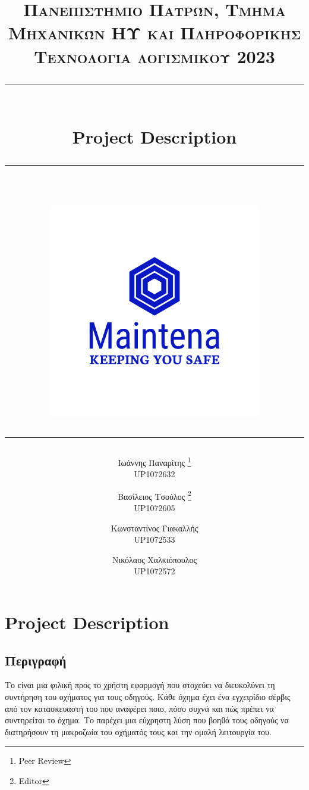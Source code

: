 \documentclass[11pt]{scrartcl} %
\title{	
	\normalfont\normalsize
	\textsc{Πανεπιστήμιο Πατρών, Τμήμα Μηχανικών ΗΥ και Πληροφορικής \\Τεχνολογία λογισμικού 2023}\\ %
	\vspace{25pt} %
	\rule{\linewidth}{0.5pt}\\ %
	\vspace{20pt} %
    {\Large Project Description}\\ %
	\vspace{12pt} %
	\rule{\linewidth}{0.5pt}\\ %
	\vspace{12pt} %
    \includegraphics[width=0.7\textwidth]{../../brand/png/logo-transparent.png}
        \rule{\linewidth}{2pt}
}
\author{
Ιωάννης Παναρίτης \thanks{Peer Review} \\UP1072632 \and Βασίλειος Τσούλος \thanks{Editor} \\UP1072605 \and Κωνσταντίνος Γιακαλλής \\UP1072533 \and \hspace{-0.9cm} Νικόλαος Χαλκιόπουλος \\ \hspace{-0.9cm}UP1072572
}
\date{} %
\begin{document}
\maketitle
\pagebreak
\Large

\tableofcontents

\section{Project Description}

\subsection{Περιγραφή}

Το  είναι μια φιλική προς το χρήστη εφαρμογή που στοχεύει να διευκολύνει τη συντήρηση του οχήματος για τους οδηγούς. Κάθε όχημα έχει ένα εγχειρίδιο σέρβις από τον κατασκευαστή του που αναφέρει ποιο, πόσο συχνά και πώς πρέπει να συντηρείται το όχημα. Το  παρέχει μια εύχρηστη λύση που βοηθά τους οδηγούς να διατηρήσουν τη μακροζωία του οχήματός τους και την ομαλή λειτουργία του.
\end{document}
